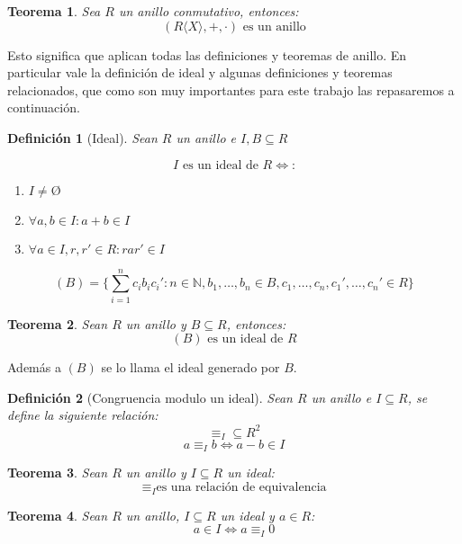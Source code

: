 \documentclass{amsbook} %
\theoremstyle{customstyle}
\newtheorem{definition}{Definición}[section]
\newtheorem{theorem}{Teorema}[section]
\begin{document}
\begin{theorem}
Sea $R$ un anillo conmutativo, entonces:
\[ (R⟨X⟩, +, ·)\text{ es un anillo} \]
\end{theorem}

Esto significa que aplican todas las definiciones y teoremas de anillo.
En particular vale la definición de ideal y algunas definiciones y teoremas relacionados, que como son muy importantes para este trabajo las repasaremos a continuación.

\begin{definition}[Ideal]\label{def:ideal}
Sean $R$ un anillo e $I, B ⊆ R$

\[ I\text{ es un ideal de }R ⇔\text{:} \]
\begin{enumerate}[label = (\alph*)]
\item $I ≠ Ø$

\item $∀a, b ∈ I : a + b ∈ I$

\item $∀a ∈ I, r, r' ∈ R : r a r' ∈ I$
\end{enumerate}

\[ (B) = \{∑_{i = 1}^n c_i b_i c_i' : n ∈ ℕ, b_1, …, b_n ∈ B, c_1, …, c_n, c_1', …, c_n' ∈ R\} \]
\end{definition}

\begin{theorem}
Sean $R$ un anillo y $B ⊆ R$, entonces:
\[ (B)\text{ es un ideal de }R \]

\end{theorem}

Además a $(B)$ se lo llama el ideal generado por $B$.

\begin{definition}[Congruencia modulo un ideal]\label{def:congruencia mod ideal}
Sean $R$ un anillo e $I ⊆ R$, se define la siguiente relación:
\[ ≡_I ⊆ R^2 \] %
\[ a ≡_I b ⇔ a - b ∈ I \]
\end{definition}

\begin{theorem}\label{thm:congruencia mod ideal es equivalencia}
Sean $R$ un anillo y $I ⊆ R$ un ideal:
\[ ≡_I \text{es una relación de equivalencia} \]
\end{theorem}

\begin{theorem}\label{thm:en ideal ⇔ congruente 0}
Sean $R$ un anillo, $I ⊆ R$ un ideal y $a ∈ R$:
\[ a ∈ I ⇔ a ≡_I 0 \]
\end{theorem}
\end{document}
